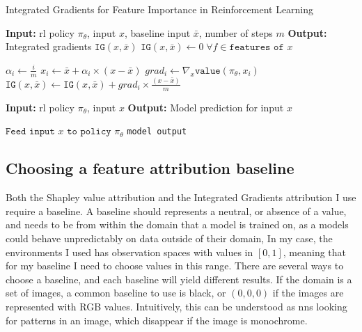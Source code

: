 \documentclass[UKenglish]{uiomasterthesis}
\begin{document}
\begin{algorithm}
\caption{Integrated Gradients for Feature Importance in Reinforcement Learning}
\label{alg:intgrad}
\begin{algorithmic}
    \State \textbf{Input:} \ac{rl} policy $\pi_\theta$, input $x$, baseline input $\bar{x}$, number of steps $m$
    \State \textbf{Output:} Integrated gradients $\texttt{IG}(x, \bar{x})$
    \State $\texttt{IG}(x, \bar{x}) \gets 0 \; \forall f \in \texttt{features of } x$ 
    
        \State $\alpha_i \gets \frac{i}{m}$
        \State $x_i \gets \bar{x} + \alpha_i \times (x - \bar{x})$
        \State $grad_i \gets \nabla_x \texttt{value}(\pi_\theta, x_i)$ 
        \State $\texttt{IG}(x, \bar{x}) \gets \texttt{IG}(x, \bar{x}) + grad_i \times \frac{(x - \bar{x})}{m}$
    \EndFor
    
        \State \textbf{Input:} \ac{rl} policy $\pi_\theta$, input $x$
        \State \textbf{Output:} Model prediction for input $x$
        
        \State $\texttt{Feed input } x \texttt{ to policy } \pi_\theta$
        \State \Return \texttt{model output}
    \EndFunction
\end{algorithmic}
\end{algorithm}


\subsection{Choosing a feature attribution baseline}
Both the Shapley value attribution and the Integrated Gradients attribution I use require a baseline. A baseline should represents a neutral, or absence of a value, and needs to be from within the domain that a model is trained on, as a models could behave unpredictably on data outside of their domain, In my case, the environments I used has observation spaces with values in $[0,1]$, meaning that for my baseline I need to choose values in this range. There are several ways to choose a baseline, and each baseline will yield different results. If the domain is a set of images, a common baseline to use is black, or $(0,0,0)$ if the images are represented with RGB values\cite{baseline_bird}. Intuitively, this can be understood as \acp{nn} looking for patterns in an image, which disappear if the image is monochrome.
\end{document}
